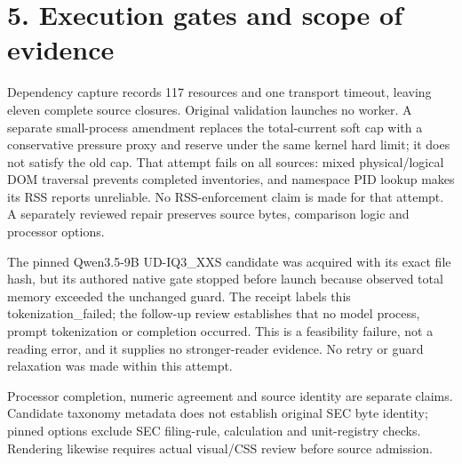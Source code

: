 \documentclass[10pt,a4paper]{article}
\begin{document}
\clearpage
\section*{5. Execution gates and scope of evidence}
Dependency capture records 117 resources and one transport timeout, leaving eleven complete source closures. Original validation launches no worker. A separate small-process amendment replaces the total-current soft cap with a conservative pressure proxy and reserve under the same kernel hard limit; it does not satisfy the old cap. That attempt fails on all sources: mixed physical/logical DOM traversal prevents completed inventories, and namespace PID lookup makes its RSS reports unreliable. No RSS-enforcement claim is made for that attempt. A separately reviewed repair preserves source bytes, comparison logic and processor options.

The pinned Qwen3.5-9B UD-IQ3\_XXS candidate was acquired with its exact file hash, but its authored native gate stopped before launch because observed total memory exceeded the unchanged guard. The receipt labels this tokenization\_failed; the follow-up review establishes that no model process, prompt tokenization or completion occurred. This is a feasibility failure, not a reading error, and it supplies no stronger-reader evidence. No retry or guard relaxation was made within this attempt.

Processor completion, numeric agreement and source identity are separate claims. Candidate taxonomy metadata does not establish original SEC byte identity; pinned options exclude SEC filing-rule, calculation and unit-registry checks. Rendering likewise requires actual visual/CSS review before source admission.
\end{document}
